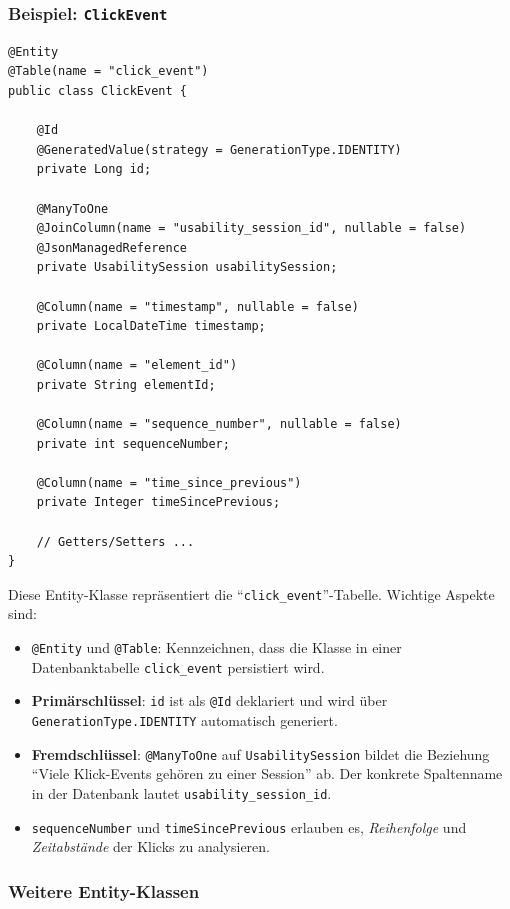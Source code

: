 \documentclass[12pt,oneside]{article}
\begin{document}
\subsubsection{Beispiel: \lstinline|ClickEvent|}
\lstset{style=java}
\begin{lstlisting}
@Entity
@Table(name = "click_event")
public class ClickEvent {
    
    @Id
    @GeneratedValue(strategy = GenerationType.IDENTITY)
    private Long id;

    @ManyToOne
    @JoinColumn(name = "usability_session_id", nullable = false)
    @JsonManagedReference
    private UsabilitySession usabilitySession;

    @Column(name = "timestamp", nullable = false)
    private LocalDateTime timestamp;

    @Column(name = "element_id")
    private String elementId;

    @Column(name = "sequence_number", nullable = false)
    private int sequenceNumber;

    @Column(name = "time_since_previous")
    private Integer timeSincePrevious;

    // Getters/Setters ...
}
\end{lstlisting}

\noindent
Diese Entity-Klasse repräsentiert die \enquote{\texttt{click\_event}}-Tabelle. Wichtige Aspekte sind:
\begin{itemize}
    \item \lstinline|@Entity| und \lstinline|@Table|: Kennzeichnen, dass die Klasse in einer Datenbanktabelle \texttt{click\_event} persistiert wird.
    \item \textbf{Primärschlüssel}: \lstinline|id| ist als \lstinline|@Id| deklariert und wird über \lstinline|GenerationType.IDENTITY| automatisch generiert.
    \item \textbf{Fremdschlüssel}: \lstinline|@ManyToOne| auf \lstinline|UsabilitySession| bildet die Beziehung \enquote{Viele Klick-Events gehören zu einer Session} ab. Der konkrete Spaltenname in der Datenbank lautet \texttt{usability\_session\_id}.
    \item \lstinline|sequenceNumber| und \lstinline|timeSincePrevious| erlauben es, \emph{Reihenfolge} und \emph{Zeitabstände} der Klicks zu analysieren.
\end{itemize}

\subsubsection{Weitere Entity-Klassen}
\end{document}
